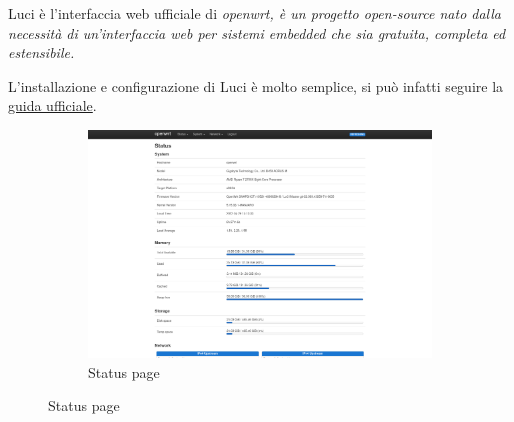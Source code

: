 
Luci è l'interfaccia web ufficiale di \it{openwrt}, è un progetto open-source nato dalla necessità di un'interfaccia web per sistemi embedded che sia gratuita, completa ed estensibile.

L'installazione e configurazione di Luci è molto semplice, si può infatti seguire la \href{https://openwrt.org/docs/guide-user/luci/luci.essentials}{guida ufficiale}.


\begin{figure}[H]
    \centering

    \begin{subfigure}{1\linewidth}
        \centering
        \includegraphics[height=0.65\linewidth]{immagini/LuCI_status}
        \caption{Status page}
        \label{fig:luci-status}
    \end{subfigure}%

    \medskip


\end{figure}
